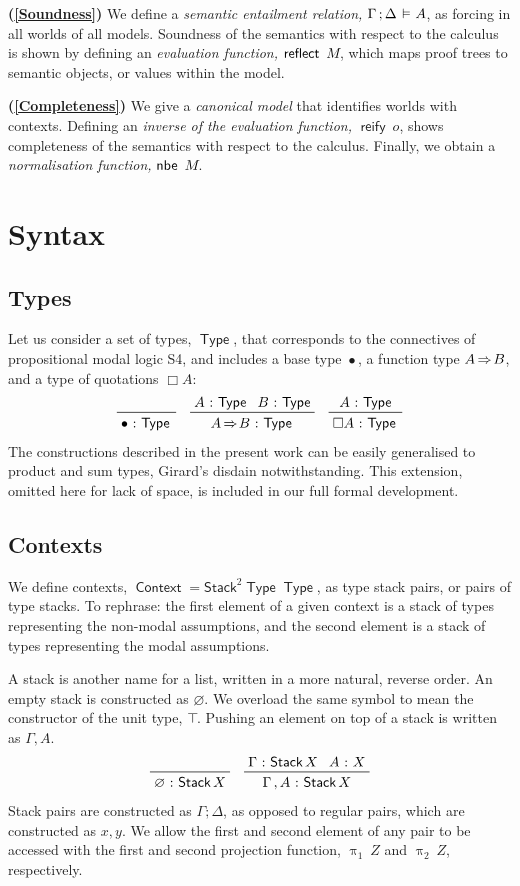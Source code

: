 \documentclass[submission,copyright,creativecommons,sharealike,backref=page]{eptcs}
\renewcommand{\:}{\mathop{\mkern3mu:\mkern3mu}}
\renewcommand{\.}{\mathop{\mkern3mu.\mkern3mu}}
\renewcommand{\;}{\mathop{;}}
\renewcommand{\,}{\mathop{,}}
\newcommand{\ef}{\mathrel{\mkern2mu\vDash\mkern1mu}}
\newcommand{\rf}{\mathop{\Rightarrow\mkern-1mu}}
\newcommand{\reflect}{\operatorname{\textsf{reflect}}}
\newcommand{\reify}{\operatorname{\textsf{reify}}}
\newcommand{\nbe}{\operatorname{\textsf{nbe}}}
\newcommand{\pii}{\operatorname{\uppi_{\scriptscriptstyle{1}}}}
\newcommand{\piii}{\operatorname{\uppi_{\scriptscriptstyle{2}}}}
\newcommand{\Stack}{\operatorname{\textsf{Stack}}}
\newcommand{\StackII}{\operatorname{\textsf{Stack}^{\scriptscriptstyle{2}}}}
\newcommand{\Type}{\operatorname{\textsf{Type}}}
\newcommand{\Context}{\operatorname{\textsf{Context}}}
\newcommand{\base}{\mathop{\bullet}}
\renewcommand{\O}{\varnothing}
\theoremstyle{mystyle}
\begin{document}
\textbf{(\ref{Soundness})} We define a \emph{semantic entailment relation,} $\Gamma \; \Delta \ef A$, as forcing in all worlds of all models.  Soundness of the semantics with respect to the calculus is shown by defining an \emph{evaluation function,} $\reflect~M\mkern-3mu$, which maps proof trees to semantic objects, or values within the model.

\textbf{(\ref{Completeness})} We give a \emph{canonical model} that identifies worlds with contexts.  Defining an \emph{inverse of the evaluation function,} $\reify~o$, shows completeness of the semantics with respect to the calculus.  Finally, we obtain a \emph{normalisation function,} $\nbe~M\mkern-3mu$.


\section{Syntax}\label{Syntax}

\subsection{Types}
Let us consider a set of types, $\Type$, that corresponds to the connectives of propositional modal logic S4, and includes a base type $\base$, a function type $A \rf B$, and a type of quotations $\Box A$:
\begin{align*}
  \prftree
    {}
    {\base \: \Type}
  \quad
  \prftree
    {A \: \Type}{B \: \Type}
    {A \rf B \: \Type}
  \quad
  \prftree
    {A \: \Type}
    {\Box A \: \Type}
\end{align*}
The constructions described in the present work can be easily generalised to product and sum types, Girard's disdain notwithstanding.  This extension, omitted here for lack of space, is included in our full formal development.

\subsection{Contexts}
We define contexts, $\Context = \StackII \Type \Type$, as type stack pairs, or pairs of type stacks.  To rephrase: the first element of a given context is a stack of types representing the non-modal assumptions, and the second element is a stack of types representing the modal assumptions.

A stack is another name for a list, written in a more natural, reverse order.  An empty stack is constructed as $\O$.  We overload the same symbol to mean the constructor of the unit type, $\top\mkern-3mu$.  Pushing an element on top of a stack is written as $\Gamma \, A$.
\begin{align*}
  \prftree
    {}
    {\O \: \Stack X}
  \quad
  \prftree
    {\Gamma \: \Stack X}{A \: X}
    {\Gamma \, A \: \Stack X}
\end{align*}
Stack pairs are constructed as $\Gamma \; \Delta$, as opposed to regular pairs, which are constructed as $x \, y$.  We allow the first and second element of any pair to be accessed with the first and second projection function, $\pii~Z$ and $\piii~Z$, respectively.
\end{document}
